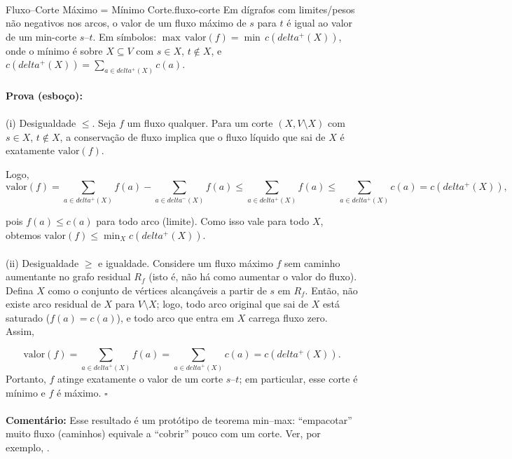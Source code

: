 \documentclass[12pt,a4paper]{article}
\def\emph#1{#1}%
\def\delta{delta}%
\begin{document}
\paragraph{}
\begin{teobox}{Fluxo–Corte Máximo = Mínimo Corte.}{fluxo-corte}
Em dígrafos com limites/pesos não negativos nos arcos, o valor de um fluxo máximo de \(s\) para \(t\) é igual ao valor de um min-corte \(s\text{--}t\). Em símbolos: \(\max\,\text{valor}(f) = \min\, c(\delta^+(X))\), onde o mínimo é sobre \(X\subseteq V\) com \(s\in X\), \(t\notin X\), e \(c(\delta^+(X))=\sum_{a\in\delta^+(X)} c(a)\).
\paragraph{}
    \textbf{Prova (esboço):}
    \paragraph{}
    \emph{(i) Desigualdade \(\le\).} Seja \(f\) um fluxo qualquer. Para um corte \((X, V\setminus X)\) com \(s\in X\), \(t\notin X\), a conservação de fluxo implica que o fluxo líquido que sai de \(X\) é exatamente \(\text{valor}(f)\).

    Logo, \[\text{valor}(f)= \sum_{a\in\delta^+(X)} f(a) - \sum_{a\in\delta^-(X)} f(a) \le \sum_{a\in\delta^+(X)} f(a) \le \sum_{a\in\delta^+(X)} c(a)=c(\delta^+(X)),\]

    pois \(f(a)\le c(a)\) para todo arco (limite). Como isso vale para todo \(X\), obtemos \(\text{valor}(f)\le \min_X c(\delta^+(X))\).

    \paragraph{}
    \emph{(ii) Desigualdade \(\ge\) e igualdade.} Considere um fluxo máximo \(f\) sem caminho aumentante no \emph{grafo residual} \(R_f\) (isto é, não há como aumentar o valor do fluxo). Defina \(X\) como o conjunto de vértices alcançáveis a partir de \(s\) em \(R_f\). Então, não existe arco residual de \(X\) para \(V\setminus X\); logo, todo arco original que sai de \(X\) está saturado (\(f(a)=c(a)\)), e todo arco que entra em \(X\) carrega fluxo zero. Assim,

    \[\text{valor}(f)=\sum_{a\in\delta^+(X)} f(a)=\sum_{a\in\delta^+(X)} c(a)=c(\delta^+(X)).\]
    Portanto, \(f\) atinge exatamente o valor de um corte \(s\text{--}t\); em particular, esse corte é mínimo e \(f\) é máximo. \hfill$\square$

\paragraph{}
\smallskip
\textbf{Comentário:} Esse resultado é um protótipo de teorema \emph{min--max}: “empacotar” muito fluxo (caminhos) equivale a “cobrir” pouco com um corte. Ver, por exemplo, \cite{schrijver2003comb}.
\end{teobox}
\end{document}
